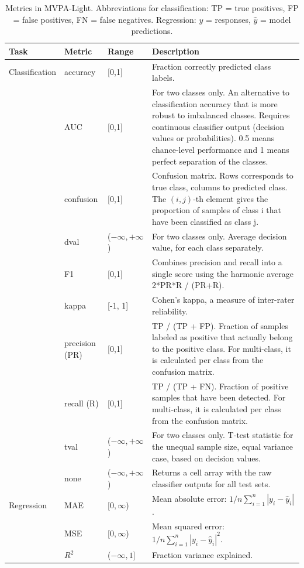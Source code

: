 \documentclass[utf8]{frontiersSCNS} %
\begin{document}
\begin{table}[]
\begin{tabularx}{\textwidth}{lllX}
Task & Metric &  Range & Description   \\\hline
Classification & accuracy  &  [0,1] &  Fraction correctly predicted class labels.\\
 & AUC & [0,1] & For two classes only. An alternative to classification accuracy that is more robust to imbalanced classes. Requires continuous classifier output (decision values or probabilities). 0.5 means chance-level performance and 1 means perfect separation of the classes.\\
 & confusion & [0,1] &  Confusion matrix. Rows corresponds to true class, columns  to predicted class. The $(i,j)$-th element gives the proportion of samples of class i that have been classified as class j.\\
 &dval & ($-\infty,+\infty$) & For two classes only. Average decision value, for each class separately.\\
 &F1 & [0,1] & Combines precision and recall into a single score using the harmonic average 2*PR*R / (PR+R).\\
&kappa & [-1, 1] & Cohen's kappa, a measure of inter-rater reliability.\\
&precision (PR) & [0,1] & TP / (TP + FP). Fraction of samples labeled as positive that actually belong to the positive class. For multi-class, it is calculated per class from the confusion matrix.\\
&recall (R) & [0,1] & TP / (TP + FN). Fraction of positive samples that have been detected. For multi-class, it is calculated per class from the confusion matrix.\\
&tval & ($-\infty,+\infty$) & For two classes only. T-test statistic for the unequal sample size, equal variance case, based on decision values.\\
&none & ($-\infty,+\infty$) & Returns a cell array with the raw classifier outputs for all test sets.\\\hline
Regression & MAE  & [$0,\infty$) &  Mean absolute error: $1/n \sum_{i=1}^n|y_i - \hat{y}_i|$.\\
& MSE  & [$0,\infty$) &  Mean squared error: $1/n \sum_{i=1}^n|y_i - \hat{y}_i|^2$.\\
& $R^2$  & ($-\infty,1$] &  Fraction variance explained.\\
\hline
\end{tabularx}
\caption{Metrics in MVPA-Light. Abbreviations for classification: TP = true positives, FP = false positives, FN = false negatives. Regression: $y$ = responses, $\hat{y}$ = model predictions.}
\label{tab:metrics}
\end{table}
\end{document}
